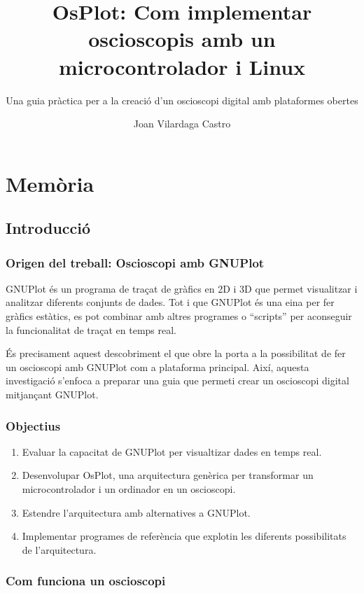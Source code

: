 \documentclass{tfgitic}[2023/06/30]
\title{OsPlot: Com implementar osci\lgem oscopis amb un microcontrolador i Linux}
\subtitle{Una guia pràctica per a la creació d'un osci\lgem oscopi digital amb plataformes obertes}
\author{Joan Vilardaga Castro}
\begin{document}
\part{Memòria}

\chapter{Introducció}
\label{cap:intro}

\section{Origen del treball: Osci\lgem oscopi amb GNUPlot}
\label{sec:origen}

GNUPlot \cite{gnuplot} és un programa de traçat de gràfics en 2D i 3D
que permet visualitzar i analitzar diferents conjunts de dades. Tot i
que GNUPlot és una eina per fer gràfics estàtics, es pot combinar amb
altres programes o ``scripts'' per aconseguir la funcionalitat de
traçat en temps real.

És precisament aquest descobriment el que obre la porta a la
possibilitat de fer un osci\lgem oscopi amb GNUPlot com a plataforma
principal. Així, aquesta investigació s'enfoca a preparar una guia que
permeti crear un osci\lgem oscopi digital mitjançant GNUPlot.

\section{Objectius}
\label{sec:objectius}

\begin{enumerate}
	\item Evaluar la capacitat de GNUPlot per visualtizar dades en
          temps real.
	\item Desenvolupar OsPlot, una arquitectura genèrica per
          transformar un microcontrolador i un ordinador en un
          osci\lgem oscopi.
      \item Estendre l'arquitectura amb alternatives a GNUPlot.
	\item Implementar programes de referència que explotin les
          diferents possibilitats de l'arquitectura.
\end{enumerate}

\section{Com funciona un osci\lgem oscopi}
\label{sec:com-funciona-oscil·loscopi}
\end{document}
